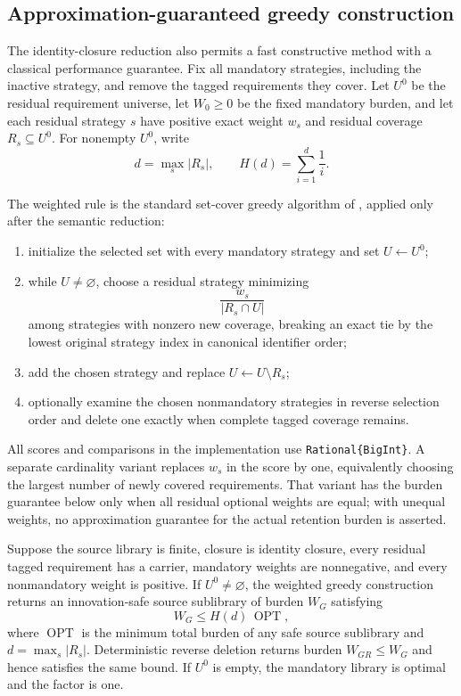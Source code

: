\subsection{Approximation-guaranteed greedy construction}
\label{subsec:aor-weighted-greedy}

The identity-closure reduction also permits a fast constructive method with a
classical performance guarantee.  Fix all mandatory strategies, including the
inactive strategy, and remove the tagged requirements they cover.  Let
$U^0$ be the residual requirement universe, let $W_0\geq 0$ be the fixed
mandatory burden, and let each residual strategy $s$ have positive exact
weight $w_s$ and residual coverage $R_s\subseteq U^0$.  For nonempty $U^0$,
write
\[
 d=\max_s |R_s|,
 \qquad
 H(d)=\sum_{i=1}^d\frac1i.
\]

The weighted rule is the standard set-cover greedy algorithm of
\citet{Chvatal1979}, applied only after the semantic reduction:

\begin{enumerate}
\item initialize the selected set with every mandatory strategy and set
      $U\leftarrow U^0$;
\item while $U\neq\varnothing$, choose a residual strategy minimizing
      \[
        \frac{w_s}{|R_s\cap U|}
      \]
      among strategies with nonzero new coverage, breaking an exact tie by
      the lowest original strategy index in canonical identifier order;
\item add the chosen strategy and replace
      $U\leftarrow U\setminus R_s$;
\item optionally examine the chosen nonmandatory strategies in reverse
      selection order and delete one exactly when complete tagged coverage
      remains.
\end{enumerate}

All scores and comparisons in the implementation use
\texttt{Rational\{BigInt\}}.  A separate cardinality variant replaces
$w_s$ in the score by one, equivalently choosing the largest number of newly
covered requirements.  That variant has the burden guarantee below only when
all residual optional weights are equal; with unequal weights, no
approximation guarantee for the actual retention burden is asserted.

\begin{theorem}
\label{thm:aor-weighted-greedy}
Suppose the source library is finite, closure is identity closure, every
residual tagged requirement has a carrier, mandatory weights are nonnegative,
and every nonmandatory weight is positive.  If $U^0\neq\varnothing$, the
weighted greedy construction returns an innovation-safe source sublibrary of
burden $W_G$ satisfying
\[
 W_G\leq H(d)\,\operatorname{OPT},
\]
where $\operatorname{OPT}$ is the minimum total burden of any safe source
sublibrary and $d=\max_s|R_s|$.  Deterministic reverse deletion returns burden
$W_{GR}\leq W_G$ and hence satisfies the same bound.  If $U^0$ is empty, the
mandatory library is optimal and the factor is one.
\end{theorem}

